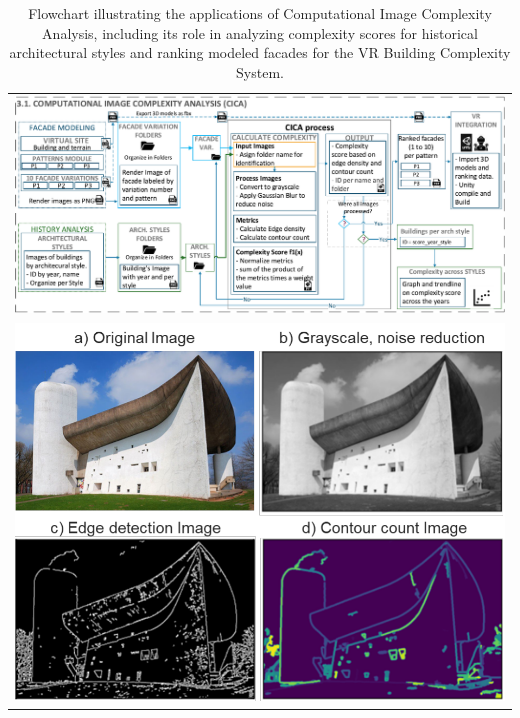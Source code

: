 \documentclass[final,5p,times]{elsarticle}
\begin{document}
        \begin{table}[htb]
            \centering
            \small
            \begin{tabular}{c}
                \begin{minipage}{\textwidth}
                    \centering
                    \includegraphics[width= \linewidth]{Images/ImageComplexityAnalysisFlowchart}
                    \caption{Flowchart illustrating the applications of Computational Image Complexity Analysis, including its role in analyzing complexity scores for historical architectural styles and ranking modeled facades for the VR Building Complexity System.}
                  \label{fig:ImageComplexityAnalysisFlowchart}
                \end{minipage}
                \\
                \begin{minipage}{\textwidth}
                    \centering
                    \begin{minipage}{0.49\textwidth}
                        \includegraphics[width= \linewidth]{Images/CICAHistoryPlot}

\end{minipage}
\end{minipage}
\end{tabular}
\end{table}
\end{document}
